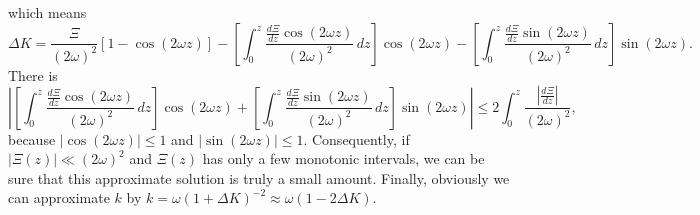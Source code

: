 \documentclass[
 jor,
 amsmath,amssymb,preprint,
]{revtex4-2}
\begin{document}
which means
\begin{equation}
    \Delta K=\frac{\Xi}{(2\omega)^2}[1-\cos(2\omega z)]-\left[\int_{0}^z\frac{\frac{d\Xi}{d z}\cos(2\omega z)}{(2\omega)^2}\,d z\right]\cos(2\omega z)-\left[\int_{0}^z\frac{\frac{d\Xi}{d z}\sin(2\omega z)}{(2\omega)^2}\,d z\right]\sin(2\omega z).
\end{equation}
There is
\begin{equation}
    \left\lvert \left[\int_{0}^z\frac{\frac{d\Xi}{d z}\cos(2\omega z)}{(2\omega)^2}\,d z\right]\cos(2\omega z)+\left[\int_{0}^z\frac{\frac{d\Xi}{d z}\sin(2\omega z)}{(2\omega)^2}\,d z\right]\sin(2\omega z)\right\rvert \leq 2\int_{0}^z\frac{\left\lvert \frac{d\Xi}{d z}\right\rvert }{(2\omega)^2},
\end{equation}
because $\left|\cos(2\omega z)\right|\leq1$ and $\left|\sin(2\omega z)\right|\leq1$. Consequently, if $\left|\Xi(z)\right|\ll(2\omega)^2$ and $\Xi(z)$ has only a few monotonic intervals, we can be sure that this approximate solution is truly a small amount. Finally, obviously we can approximate $k$ by $k=\omega(1+\Delta K)^{-2}\approx \omega(1-2\Delta K)$.

\begin{comment}
\begin{equation}
    H=C_+e^{-pz}e^{+i\omega\sqrt{1-(\frac{p}{\omega})^2}z}+C_-e^{-pz}e^{-i\omega\sqrt{1-(\frac{p}{\omega})^2}z}
\end{equation}
\begin{equation}
    H|_{z=0}=C_++C_-=1
\end{equation}
\begin{equation}
    \frac{d H}{d z}|_{z=0}=C_+(-p+i\omega\sqrt{1-(\frac{p}{\omega})^2})+C_-(-p-i\omega\sqrt{1-(\frac{p}{\omega})^2})=i\omega
\end{equation}
\begin{equation}
    C_\pm=\frac{1}{2}\pm\frac{1-\frac{p}{\omega}i}{2\sqrt{1-(\frac{p}{\omega})^2}}
\end{equation}
\begin{equation}
    H=(\frac{1}{2}+\frac{1-\frac{p}{\omega}i}{2\sqrt{1-(\frac{p}{\omega})^2}})e^{-pz}(\cos\omega\sqrt{1-(\frac{p}{\omega})^2}z+i\sin\omega\sqrt{1-(\frac{p}{\omega})^2}z)+(\frac{1}{2}-\frac{1-\frac{p}{\omega}i}{2\sqrt{1-(\frac{p}{\omega})^2}})e^{-pz}(\cos\omega\sqrt{1-(\frac{p}{\omega})^2}z-i\sin\omega\sqrt{1-(\frac{p}{\omega})^2}z)
\end{equation}
\begin{equation}
    H=[e^{-pz}\cos\omega\sqrt{1-(\frac{p}{\omega})^2}z+\frac{\frac{p}{\omega}}{\sqrt{1-(\frac{p}{\omega})^2}}e^{-pz}\sin\omega\sqrt{1-(\frac{p}{\omega})^2}z]+i[\frac{1}{\sqrt{1-(\frac{p}{\omega})^2}}e^{-pz}\sin\omega\sqrt{1-(\frac{p}{\omega})^2}z]
\end{equation}
\end{comment}
\end{document}
